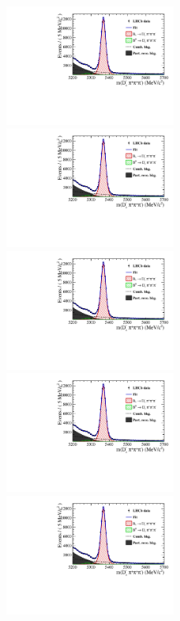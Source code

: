 \begin{figure}[h]
\includegraphics[height=!,width=0.5\textwidth]{figs/MassFit/norm_y15_phipi.pdf}
\includegraphics[height=!,width=0.5\textwidth]{figs/MassFit/norm_y15_KsK.pdf}
\includegraphics[height=!,width=0.5\textwidth]{figs/MassFit/norm_y15_KKpi_NR.pdf}
\includegraphics[height=!,width=0.5\textwidth]{figs/MassFit/norm_y15_pipipi.pdf}
\includegraphics[height=!,width=0.5\textwidth]{figs/MassFit/norm_y16_phipi.pdf}

\end{figure}
